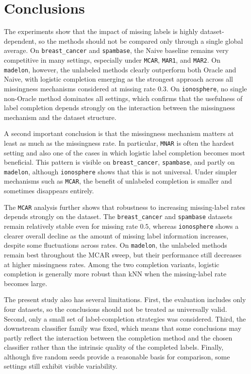 \documentclass[8pt,a4paper]{extarticle}
\begin{document}
\section{Conclusions}

The experiments show that the impact of missing labels is highly dataset-dependent, so the methods should not be compared only through a single global average. On \texttt{breast\_cancer} and \texttt{spambase}, the Naive baseline remains very competitive in many settings, especially under \texttt{MCAR}, \texttt{MAR1}, and \texttt{MAR2}. On \texttt{madelon}, however, the unlabeled methods clearly outperform both Oracle and Naive, with logistic completion emerging as the strongest approach across all missingness mechanisms considered at missing rate $0.3$. On \texttt{ionosphere}, no single non-Oracle method dominates all settings, which confirms that the usefulness of label completion depends strongly on the interaction between the missingness mechanism and the dataset structure.

A second important conclusion is that the missingness mechanism matters at least as much as the missingness rate. In particular, \texttt{MNAR} is often the hardest setting and also one of the cases in which logistic label completion becomes most beneficial. This pattern is visible on \texttt{breast\_cancer}, \texttt{spambase}, and partly on \texttt{madelon}, although \texttt{ionosphere} shows that this is not universal. Under simpler mechanisms such as \texttt{MCAR}, the benefit of unlabeled completion is smaller and sometimes disappears entirely.

The \texttt{MCAR} analysis further shows that robustness to increasing missing-label rates depends strongly on the dataset. The \texttt{breast\_cancer} and \texttt{spambase} datasets remain relatively stable even for missing rate $0.5$, whereas \texttt{ionosphere} shows a clearer overall decline as the amount of missing label information increases, despite some fluctuations across rates. On \texttt{madelon}, the unlabeled methods remain best throughout the MCAR sweep, but their performance still decreases at higher missingness rates. Among the two completion variants, logistic completion is generally more robust than kNN when the missing-label rate becomes large.

The present study also has several limitations. First, the evaluation includes only four datasets, so the conclusions should not be treated as universally valid. Second, only a small set of label-completion strategies was considered. Third, the downstream classifier family was fixed, which means that some conclusions may partly reflect the interaction between the completion method and the chosen classifier rather than the intrinsic quality of the completed labels. Finally, although five random seeds provide a reasonable basis for comparison, some settings still exhibit visible variability.
\end{document}
